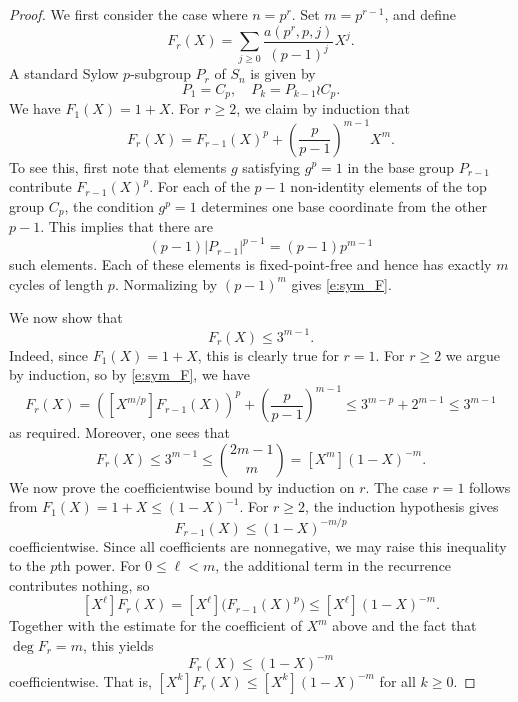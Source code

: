 \documentclass[11pt]{amsart}
\numberwithin{equation}{section}
\theoremstyle{definition}
\theoremstyle{remark}
\begin{document}
\begin{proof}
    We first consider the case where $n = p^r$. Set $m = p^{r-1}$, and define
    \begin{equation*}
        F_r(X) = \sum_{j\geqslant 0} \frac{a(p^r,p,j)}{(p-1)^j}X^j.
    \end{equation*}
    A standard Sylow $p$-subgroup $P_r$ of $S_n$ is given by
    \begin{equation*}
        P_1 = C_p, \quad P_k = P_{k-1}\wr C_p.
    \end{equation*}
    We have $F_1(X) = 1+X$.
    For $r\geqslant 2$, we claim by induction that
    \begin{equation}\label{e:sym_F}
        F_r(X) = F_{r-1}(X)^p+\left( \frac{p}{p-1} \right)^{m-1}X^{m}.
    \end{equation}
    To see this, first note that elements $g$ satisfying $g^p = 1$
    in the base group $P_{r-1}$ contribute $F_{r-1}(X)^p$.
    For each of the $p-1$ non-identity elements of the top group $C_p$,
    the condition $g^p = 1$ determines one base coordinate from the other $p-1$.
    This implies that there are
    \begin{equation*}
        (p-1)|P_{r-1}|^{p-1} = (p-1)p^{m-1}
    \end{equation*}
    such elements.
    Each of these elements is fixed-point-free and hence has exactly $m$ cycles of length $p$. Normalizing by $(p-1)^{m}$ gives \eqref{e:sym_F}.

    We now show that
    \begin{equation*}
        [X^m]F_r(X) \leqslant 3^{m-1}.
    \end{equation*}
 Indeed, since $F_1(X) = 1+X$, this is clearly true for $r = 1$. For $r\geqslant 2$ we argue by induction, so by \eqref{e:sym_F}, we have
    \begin{equation*}
        [X^m]F_r(X) = ([X^{m/p}]F_{r-1}(X))^p+\left( \frac{p}{p-1} \right)^{m-1} \leqslant 3^{m-p}+2^{m-1} \leqslant3^{m-1}
    \end{equation*}
    as required. Moreover, one sees that
    \begin{equation*}
        [X^m]F_r(X) \leqslant 3^{m-1}\leqslant {2m-1\choose m} = [X^m](1-X)^{-m}.
    \end{equation*}
We now prove the coefficientwise bound by induction on $r$.
The case $r=1$ follows from
$F_1(X)=1+X\le (1-X)^{-1}$.
For $r\ge 2$, the induction hypothesis gives
\[
F_{r-1}(X)\le (1-X)^{-m/p}
\]
coefficientwise. Since all coefficients are nonnegative,
we may raise this inequality to the $p$th power.
For $0\le \ell<m$, the additional term in the recurrence
contributes nothing, so
\[
[X^\ell]F_r(X)
=
[X^\ell]\bigl(F_{r-1}(X)^p\bigr)
\le
[X^\ell](1-X)^{-m}.
\]
Together with the estimate for the coefficient of $X^m$
above and the fact that $\deg F_r=m$, this yields
    \begin{equation}\label{e:sym_F_2}
        F_r(X) \leqslant (1-X)^{-m}
    \end{equation}
    coefficientwise. That is, $[X^k]F_r(X) \leqslant[X^k](1-X)^{-m}$ for all $k\geqslant 0$.


\end{proof}
\end{document}
